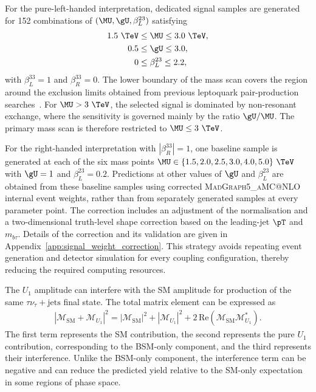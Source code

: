 For the pure-left-handed interpretation, dedicated signal samples are generated for 152 combinations of $(\MU,\gU,\beta_L^{23})$ satisfying
\begin{align}
    1.5~\TeV &\leq \MU \leq 3.0~\TeV, \\
    0.5 &\leq \gU \leq 3.0, \\
    0 &\leq \beta_L^{23} \leq 2.2,
\end{align}
with $\beta_L^{33}=1$ and $\beta_R^{33}=0$.
The lower boundary of the mass scan covers the region around the exclusion limits obtained from previous leptoquark pair-production searches~\cite{ATLAS2023LQBTau,CMS2021LQThirdGen}.
For $\MU>3~\TeV$, the selected signal is dominated by non-resonant exchange, where the sensitivity is governed mainly by the ratio $\gU/\MU$.
The primary mass scan is therefore restricted to $\MU\leq3~\TeV$.

For the right-handed interpretation with $|\beta_R^{33}|=1$, one baseline sample is generated at each of the six mass points $\MU\in\{1.5,2.0,2.5,3.0,4.0,5.0\}~\TeV$ with $\gU=1$ and $\beta_L^{23}=0.2$.
Predictions at other values of $\gU$ and $\beta_L^{23}$ are obtained from these baseline samples using corrected \textsc{MadGraph5\_aMC@NLO} internal event weights, rather than from separately generated samples at every parameter point.
The correction includes an adjustment of the normalisation and a two-dimensional truth-level shape correction based on the leading-jet $\pT$ and $m_{b\tau}$.
Details of the correction and its validation are given in Appendix~\ref{app:signal_weight_correction}.
This strategy avoids repeating event generation and detector simulation for every coupling configuration, thereby reducing the required computing resources.

The $U_{1}$ amplitude can interfere with the SM amplitude for production of the same $\tau\nu_{\tau}+\mathrm{jets}$ final state.
The total matrix element can be expressed as
\begin{align}
    \left|\mathcal{M}_{\mathrm{SM}}+\mathcal{M}_{U_1}\right|^{2}
    =
    \left|\mathcal{M}_{\mathrm{SM}}\right|^{2}
    +
    \left|\mathcal{M}_{U_1}\right|^{2}
    +
    2\,\mathrm{Re}
    \left(
        \mathcal{M}_{\mathrm{SM}}
        \mathcal{M}_{U_1}^{*}
    \right).
    \label{eq:signal_interference}
\end{align}
The first term represents the SM contribution, the second represents the pure $U_{1}$ contribution, corresponding to the BSM-only component, and the third represents their interference.
Unlike the BSM-only component, the interference term can be negative and can reduce the predicted yield relative to the SM-only expectation in some regions of phase space.

